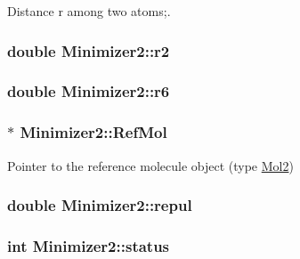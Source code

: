Distance r among two atoms;. 

\hypertarget{classMinimizer2_ac39a59aea04d00554b1c55d2d6341897}{
\subsubsection[{r2}]{\setlength{\rightskip}{0pt plus 5cm}double {\bf Minimizer2::r2}}}
\label{classMinimizer2_ac39a59aea04d00554b1c55d2d6341897}
\hypertarget{classMinimizer2_a6eb98a0ee8462eb25479560885798552}{
\subsubsection[{r6}]{\setlength{\rightskip}{0pt plus 5cm}double {\bf Minimizer2::r6}}}
\label{classMinimizer2_a6eb98a0ee8462eb25479560885798552}
\hypertarget{classMinimizer2_ac00d3a0aba2c77a4202fb647d3dbb561}{
\subsubsection[{RefMol}]{ $\ast$ {\bf Minimizer2::RefMol}}}
\label{classMinimizer2_ac00d3a0aba2c77a4202fb647d3dbb561}


Pointer to the reference molecule object (type \hyperlink{classMol2}{Mol2}) 

\hypertarget{classMinimizer2_aed61b49820c062adf7cd7dd5b4a27555}{
\subsubsection[{repul}]{\setlength{\rightskip}{0pt plus 5cm}double {\bf Minimizer2::repul}}}
\label{classMinimizer2_aed61b49820c062adf7cd7dd5b4a27555}
\hypertarget{classMinimizer2_ab2fc020ca4f53c83045abb9533932e8f}{
\subsubsection[{status}]{\setlength{\rightskip}{0pt plus 5cm}int {\bf Minimizer2::status}}}
\label{classMinimizer2_ab2fc020ca4f53c83045abb9533932e8f}


